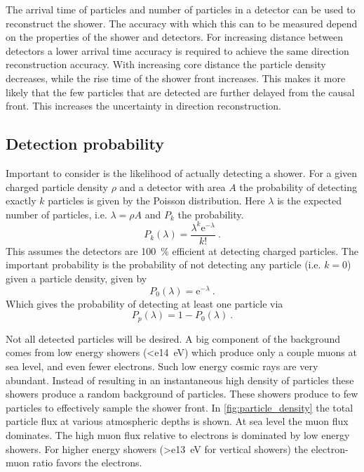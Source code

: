 The arrival time of particles and number of particles in a detector can be used to reconstruct the shower. The accuracy with which this can to be measured depend on the properties of the shower and detectors. For increasing distance between detectors a lower arrival time accuracy is required to achieve the same direction reconstruction accuracy. With increasing core distance the particle density decreases, while the rise time of the shower front increases. This makes it more likely that the few particles that are detected are further delayed from the causal front. This increases the uncertainty in direction reconstruction.

\subsection{Detection probability}
\label{ssec:detection_probability}

Important to consider is the likelihood of actually detecting a shower. For a given charged particle density $\rho$ and a detector with area $A$ the probability of detecting exactly $k$ particles is given by the Poisson distribution. Here $\lambda$ is the expected number of particles, i.e. $\lambda = \rho A$ and $P_k$ the probability.
%
\begin{equation}
    \label{eq:poisson}
    P_k(\lambda) = \frac{\lambda^k \mathrm{e}^{-\lambda}}{k!} \ .
\end{equation}
%
This assumes the detectors are \SI{100}{\percent} efficient at detecting charged particles. The important probability is the probability of not detecting any particle (i.e. $k = 0$) given a particle density, given by
%
\begin{equation}
    P_0(\lambda) = \mathrm{e}^{-\lambda} \ .
\end{equation}
%
Which gives the probability of detecting at least one particle via
%
\begin{equation}
    P_p(\lambda) = 1-P_0(\lambda) \ .
\end{equation}

Not all detected particles will be desired. A big component of the background comes from low energy showers (\SI{<e14}{\eV}) which produce only a couple muons at sea level, and even fewer electrons. Such low energy cosmic rays are very abundant. Instead of resulting in an instantaneous high density of particles these showers produce a random background of particles. These showers produce to few particles to effectively sample the shower front. In \cref{fig:particle_density} the total particle flux at various atmospheric depths is shown. At sea level the muon flux dominates. The high muon flux relative to electrons is dominated by low energy showers. For higher energy showers (\SI{>e13}{\eV} for vertical showers) the electron-muon ratio favors the electrons.

